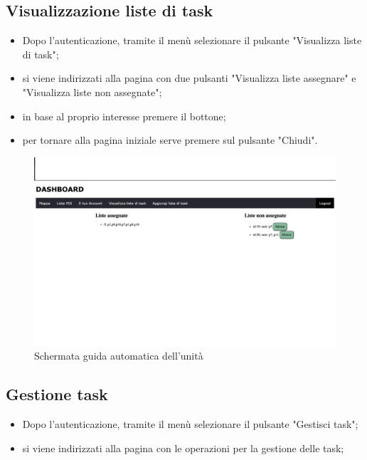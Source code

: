 \subsection{Visualizzazione liste di task}
\begin{itemize}
    \item Dopo l'autenticazione, tramite il menù selezionare il pulsante "Visualizza liste di task";
    \item si viene indirizzati alla pagina con due pulsanti "Visualizza liste assegnare" e "Visualizza liste non assegnate";
    \item in base al proprio interesse premere il bottone;
    \item per tornare alla pagina iniziale serve premere sul pulsante "Chiudi".
\end{itemize}
\begin{figure}[H]
    \centering
    \includegraphics[scale=0.12]{res/images/task_manager.png}
    \caption{Schermata guida automatica dell'unità}
\end{figure}
\subsection{Gestione task}
\begin{itemize}
    \item Dopo l'autenticazione, tramite il menù selezionare il pulsante "Gestisci task";
    \item si viene indirizzati alla pagina con le operazioni per la gestione delle task;
\end{itemize}
